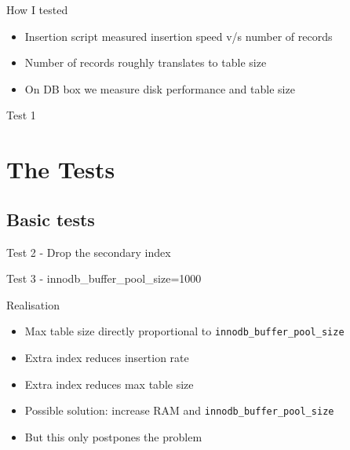 \documentclass{beamer}
\begin{document}
\begin{frame}{How I tested}
  \begin{itemize}
  \item Insertion script measured insertion speed v/s number of records
  \item Number of records roughly translates to table size
  \item On DB box we measure disk performance and table size
  \end{itemize}
\end{frame}

\begin{frame}{Test 1}
\end{frame}


\section{The Tests}
\subsection{Basic tests}

\begin{frame}{Test 2 - Drop the secondary index}
\end{frame}

\begin{frame}{Test 3 - innodb\_buffer\_pool\_size=1000}
\end{frame}

\begin{frame}{Realisation}
  \begin{itemize}
  \item Max table size directly proportional to \texttt{innodb\_buffer\_pool\_size}
  \item Extra index reduces insertion rate
  \item Extra index reduces max table size
  \item<2-> Possible solution: increase RAM and \texttt{innodb\_buffer\_pool\_size}
  \item<2-> But this only postpones the problem
  \end{itemize}
\end{frame}
\end{document}
